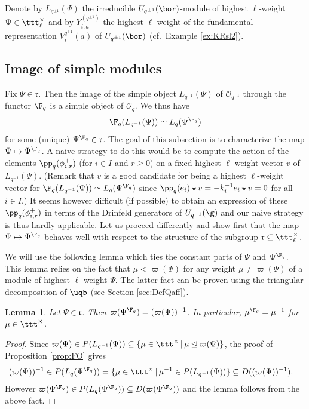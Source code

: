 \documentclass[11pt]{amsart}
\newtheorem{lem}[theorem]{Lemma}
\theoremstyle{definition}
\theoremstyle{remark}
\numberwithin{equation}{section}
\begin{document}
Denote by $L_{q^{\pm 1}}(\Psi)$ the irreducible $U_{q^{\pm 1}}(\bor)$-module of highest $\ell$-weight $\Psi\in \ttt^{\times}_{\ell}$ and by $Y_{i,a}^{(q^{\pm 1})}$ the highest $\ell$-weight of the fundamental representation $V_i^{q^{\pm 1}}(a)$ of $U_{q^{\pm 1}}(\bor)$ (cf.~Example \ref{ex:KRsl2}). 
\subsection{Image of simple modules}\label{sec:ImSimple} Fix $\Psi\in \mathfrak{r}$. Then the image of the simple object $L_{q^{-1}}(\Psi)$ of $\mathcal{O}_{q^{-1}}$ through the functor $\F_q$ is a simple object of $\mathcal{O}_q$. We thus have
$$ \F_q (L_{q^{-1}}(\Psi)) \simeq L_q(\Psi^{\F_q})$$
for some (unique) $\Psi^{\F_q}\in \mathfrak{r}$. The goal of this subsection is to characterize the map $\Psi\mapsto \Psi^{\F_q}$. A naive strategy to do this would be to compute the action of the elements $\pp_q(\phi_{i,r}^+)$ (for $i\in I$ and $r\geq 0$) on a fixed highest $\ell$-weight vector $v$ of $L_{q^{-1}}(\Psi)$. (Remark that $v$ is a good candidate for being a highest $\ell$-weight vector for $ \F_q (L_{q^{-1}}(\Psi)) \simeq L_q(\Psi^{\F_q})$ since $\pp_q(e_i)\star v = -k_i^{-1}e_i\star v = 0$ for all $i\in I$.) It seems however difficult (if possible) to obtain an expression of these $\pp_q(\phi_{i,r}^+)$ in terms of the Drinfeld generators of $U_{q^{-1}}(\g)$ and our naive strategy is thus hardly applicable. Let us proceed differently and show first that the map $\Psi\mapsto \Psi^{\F_q}$ behaves well with respect to the structure of the subgroup $\mathfrak{r}\subseteq \ttt_{\ell}^{\times}$.\par 
We will use the following lemma which ties the constant parts of $\Psi$ and $\Psi^{\F_q}$. This lemma relies on the fact that $\mu < \varpi(\Psi)$ for any weight $\mu\neq\varpi(\Psi)$ of a module of highest $\ell$-weight $\Psi$. The latter fact can be proven using the triangular decomposition of $\uqb$ (see Section \ref{sec:DefQaff}).
\begin{lem}\label{lemma:varpiPsiF} Let $\Psi\in \mathfrak{r}$. Then $\varpi(\Psi^{\F_q})=(\varpi(\Psi))^{-1}$. In particular, $\mu^{\F_q} = \mu^{-1}$ for $\mu\in\ttt^{\times}$.
\end{lem}
\begin{proof} Since $\varpi(\Psi)\in P(L_{q^{-1}}(\Psi)) \subseteq \{\mu\in \ttt^{\times}\,|\,\mu \unlhd \varpi(\Psi)\}$, the proof of Proposition \ref{prop:FO} gives 
\begin{align*}
(\varpi(\Psi))^{-1} &\in P(L_q(\Psi^{\F_q}))
=\{\mu\in \ttt^{\times}\,|\,\mu^{-1}\in P(L_{q^{-1}}(\Psi))\} \subseteq  D((\varpi(\Psi))^{-1}).
\end{align*}
However $\varpi(\Psi^{\F_q}) \in P(L_q(\Psi^{\F_q}))\subseteq D(\varpi(\Psi^{\F_q}))$ and the lemma follows from the above fact.
\end{proof}
\end{document}
